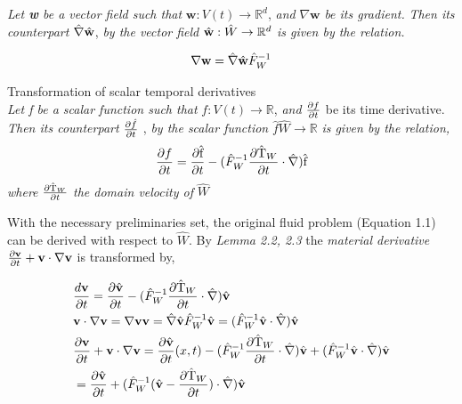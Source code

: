 \begin{lem}
\textit{Let \textbf{w} be a vector field such that} $\mathbf{w}: V(t) \rightarrow \mathbb{R}^d$, \textit{and} $\nabla \mathbf{w}$ \textit{be its gradient.}
\textit{Then its counterpart} $\hat{\mathbf{\nabla}}\hat{\mathbf{w}}$, \textit{by the vector field}  $\hat{\mathbf{w}}: \hat{W} \rightarrow \mathbb{R}^d$ \textit{is given by the relation.} 

\begin{align}
\nabla \mathbf{w} = \hat{\mathbf{\nabla}}\hat{\mathbf{w}} \hat{F}_W^{-1} 
\end{align} 
\end{lem}

\begin{lem}
Transformation of scalar temporal derivatives \\
\textit{Let f be a scalar function such that} $f: V(t) \rightarrow \mathbb{R}$, \textit{and} $\frac{\partial f}{\partial t}$ be its time derivative. \textit{Then its counterpart} $\frac{\partial \hat{f}}{\partial t}$ , \textit{by the scalar function}  $\hat{f} \hat{W} \rightarrow \mathbb{R}$ \textit{is given by the relation,} 
\begin{align}
\frac{\partial f}{\partial t} = \frac{\partial \text{\^{f}} }{\partial t} - (\hat{F}_W^{-1} \frac{\partial \text{\^{T}}_W}{\partial t} \cdot \hat{\nabla}) \text{\^{f}}
\end{align}
 \textit{where} $\frac{\partial \text{\^{T}}_W}{\partial t}$ \textit{the domain velocity of}  $\hat{W}$
\end{lem}


With the necessary preliminaries set, the original fluid problem (Equation 1.1) can be derived with respect to $\hat{W}$. By \textit{Lemma 2.2, 2.3}  the \textit{material derivative} $\frac{\partial \mathbf{v}}{\partial t} + \mathbf{v} \cdot \nabla \mathbf{v}$ is transformed by, 

\begin{align}
&\frac{d \mathbf{v}}{\partial t} = 
\frac{\partial \hat{\mathbf{v}}}{\partial t} - (\hat{F}_W^{-1}\frac{\partial \text{\^{T}}_W}{\partial t} \cdot \hat{\nabla})\hat{\mathbf{v}} \\
&\mathbf{v} \cdot \nabla \mathbf{v} = \nabla \mathbf{v} \mathbf{v} = 
\hat{\mathbf{\nabla}}\hat{\mathbf{v}}\hat{F}_W^{-1}\hat{\mathbf{v}} = (\hat{F}_W^{-1}\hat{\mathbf{v}} \cdot \hat{\nabla})\hat{\mathbf{v}} \\
&\frac{\partial \mathbf{v}}{\partial t} + \mathbf{v} \cdot \nabla \mathbf{v} = 
\frac{\partial \hat{\mathbf{v}}}{\partial t}(x,t) - (\hat{F}_W^{-1}\frac{\partial \text{\^{T}}_W}{\partial t} \cdot \hat{\nabla})\hat{\mathbf{v}}
+ (\hat{F}_W^{-1}\hat{\mathbf{v}} \cdot \hat{\nabla})\hat{\mathbf{v}}  \\
&= \frac{\partial \hat{\mathbf{v}}}{\partial t} + (\hat{F}_W^{-1}(\hat{\mathbf{v}} - \frac{\partial \text{\^{T}}_W}{\partial t}) \cdot \hat{\nabla}) \hat{\mathbf{v}}
\end{align}

